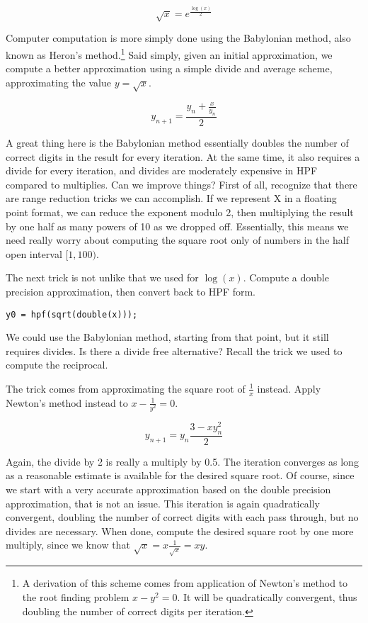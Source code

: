 \documentclass[a4paper,12pt]{article}
\begin{document}
\begin{equation}
   \sqrt x = e^{\frac{\log(x)}{2}}
\end{equation}

Computer computation is more simply done using the Babylonian method, also known as Heron's method.\footnote{A derivation of this scheme comes from application of Newton's method to the root finding problem $x - y^2 = 0$. It will be quadratically convergent, thus doubling the number of correct digits per iteration.} Said simply, given an initial approximation, we compute a better approximation using a simple divide and average scheme, approximating the value $y = \sqrt x$.

\begin{equation}
   y_{n+1} = \frac{y_n + \frac{x}{y_n}}{2}
\end{equation}

A great thing here is the Babylonian method essentially doubles the number of correct digits in the result for every iteration. At the same time, it also requires a divide for every iteration, and divides are moderately expensive in HPF compared to multiplies. Can we improve things? First of all, recognize that there are range reduction tricks we can accomplish. If we represent X in a floating point format, we can reduce the exponent modulo 2, then multiplying the result by one half as many powers of 10 as we dropped off. Essentially, this means we need really worry about computing the square root only of numbers in the half open interval $[1,100)$.

The next trick is not unlike that we used for $\log(x)$. Compute a double precision approximation, then convert back to HPF form.

\begin{lstlisting}
y0 = hpf(sqrt(double(x)));
\end{lstlisting}

We could use the Babylonian method, starting from that point, but it still requires divides. Is there a divide free alternative? Recall the trick we used to compute the reciprocal.

The trick comes from approximating the square root of $\frac{1}{x}$ instead. Apply Newton's method instead to $x - \frac{1}{y^2} = 0$.

\begin{equation}
   y_{n+1} = y_n \frac{3 - x y_n^2}{2}
\end{equation}

Again, the divide by 2 is really a multiply by 0.5. The iteration converges as long as a reasonable estimate is available for the desired square root. Of course, since we start with a very accurate approximation based on the double precision approximation, that is not an issue. This iteration is again quadratically convergent, doubling the number of correct digits with each pass through, but no divides are necessary. When done, compute the desired square root by one more multiply, since we know that $\sqrt{x} = x \frac{1}{\sqrt{x}} = x y$.
\end{document}

